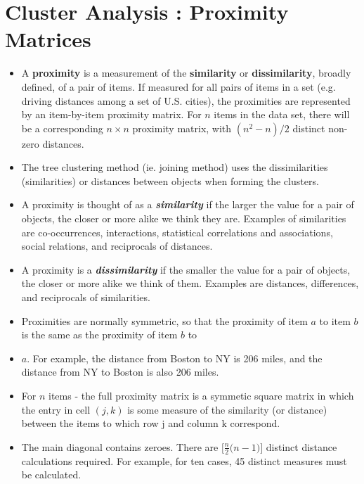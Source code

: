 \documentclass[a4paper,12pt]{report}
\begin{document}
\section{Cluster Analysis : Proximity Matrices}
\begin{itemize}
\item A \textbf{proximity} is a measurement of the \textbf{similarity} or \textbf{dissimilarity}, broadly defined, of a pair of items. If measured for all pairs of items in a set (e.g. driving distances among a set of U.S. cities), the proximities are represented by an item-by-item proximity matrix. For $n$ items in the data set, there will be a corresponding $n \times n$ proximity matrix, with $(n^2-n)/2$ distinct non-zero distances.

\item 
The tree clustering method (ie. joining method) uses the dissimilarities (similarities) or distances between objects when forming the clusters. 

\item A proximity is thought of as a \textbf{\textit{similarity}} if the larger the value for a pair of objects, the closer or more alike we think they are. Examples of similarities are co-occurrences, interactions, statistical correlations and associations, social relations, and reciprocals of distances. 
\item A proximity is a \textbf{\textit{dissimilarity}} if the smaller the value for a pair of objects, the closer or more alike we think of them. Examples are distances, differences, and reciprocals of similarities. 

\item Proximities are normally symmetric, so that the proximity of item $a$ to item $b$ is the same as the proximity of item $b$ to \item $a$. For example, the distance from Boston to NY is 206 miles, and the distance from NY to Boston is also 206 miles.\\ %



\item For $n$ items - the full proximity matrix is a symmetic square matrix in which the entry in cell $(j, k)$ is some measure of the similarity (or distance) between the items to which row j and column k correspond.

\item The main diagonal contains zeroes. There are $\displaystyle \bigg[ \frac{n}{2} \bigg( n-1 \bigg) \bigg]$ distinct distance calculations required. For example, for ten cases, 45 distinct measures must be calculated.
\end{itemize}
\smallskip
\end{document}
